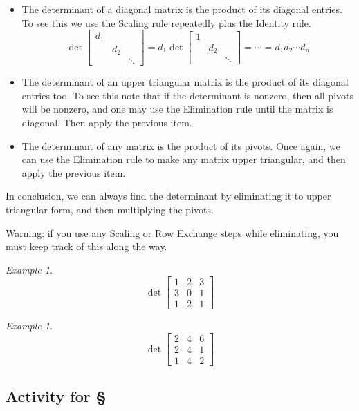 \documentclass[11pt,oneside]{amsbook}
\theoremstyle{definition}
\theoremstyle{plain}
\theoremstyle{definition}
\theoremstyle{remark}
\newtheorem{example}[theorem]{Example}
\numberwithin{equation}{section}
\numberwithin{figure}{section}
\begin{document}
\begin{itemize}
  \item The determinant of a diagonal matrix is the product of its diagonal entries. To see this we use the Scaling rule repeatedly plus the Identity rule.
    \[\det\begin{bmatrix}d_1&&\\&d_2&\\&&\ddots\end{bmatrix}
      =d_1\det\begin{bmatrix}1&&\\&d_2&\\&&\ddots\end{bmatrix}
      =\cdots=d_1d_2\cdots d_n
    \]
  \item The determinant of an upper triangular matrix is the product of its diagonal entries too. To see this note that if the determinant is nonzero, then all pivots will be nonzero, and one may use the Elimination rule until the matrix is diagonal. Then apply the previous item.
  \item The determinant of any matrix is the product of its pivots. Once again, we can use the Elimination rule to make any matrix upper triangular, and then apply the previous item.
\end{itemize}

In conclusion, we can always find the determinant by eliminating it to upper triangular form, and then multiplying the pivots.

Warning: if you use any Scaling or Row Exchange steps while eliminating, you must keep track of this along the way.

\begin{example}
  \[\det\begin{bmatrix}1&2&3\\3&0&1\\1&2&1\end{bmatrix}
  \]
\end{example}

\begin{example}
  \[\det\begin{bmatrix}2&4&6\\2&4&1\\1&4&2\end{bmatrix}
  \]
\end{example}
  
\newpage
\subsection*{Activity for \S \thesection}
\end{document}
